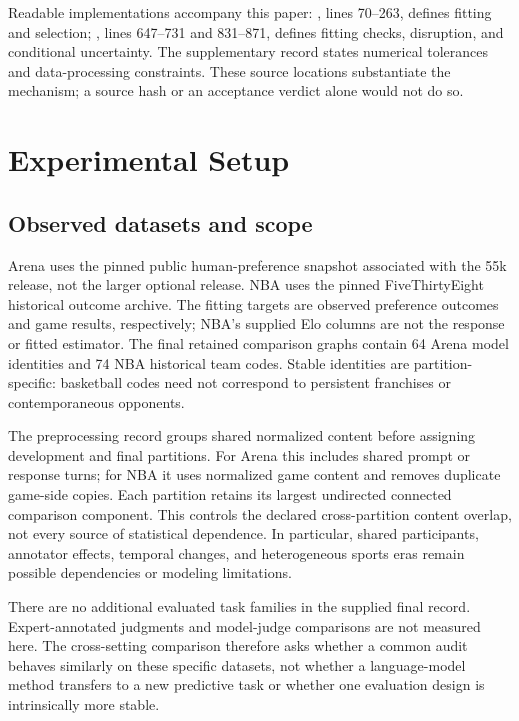 \documentclass{article}
\begin{document}
Readable implementations accompany this paper: , lines 70--263, defines fitting and selection; , lines 647--731 and 831--871, defines fitting checks, disruption, and conditional uncertainty. The supplementary record states numerical tolerances and data-processing constraints. These source locations substantiate the mechanism; a source hash or an acceptance verdict alone would not do so.

\section{Experimental Setup}
\subsection{Observed datasets and scope}
Arena uses the pinned public human-preference snapshot associated with the 55k release, not the larger optional release. NBA uses the pinned FiveThirtyEight historical outcome archive. The fitting targets are observed preference outcomes and game results, respectively; NBA's supplied Elo columns are not the response or fitted estimator. The final retained comparison graphs contain 64 Arena model identities and 74 NBA historical team codes. Stable identities are partition-specific: basketball codes need not correspond to persistent franchises or contemporaneous opponents.

The preprocessing record groups shared normalized content before assigning development and final partitions. For Arena this includes shared prompt or response turns; for NBA it uses normalized game content and removes duplicate game-side copies. Each partition retains its largest undirected connected comparison component. This controls the declared cross-partition content overlap, not every source of statistical dependence. In particular, shared participants, annotator effects, temporal changes, and heterogeneous sports eras remain possible dependencies or modeling limitations.

There are no additional evaluated task families in the supplied final record. Expert-annotated judgments and model-judge comparisons are not measured here. The cross-setting comparison therefore asks whether a common audit behaves similarly on these specific datasets, not whether a language-model method transfers to a new predictive task or whether one evaluation design is intrinsically more stable.
\end{document}
